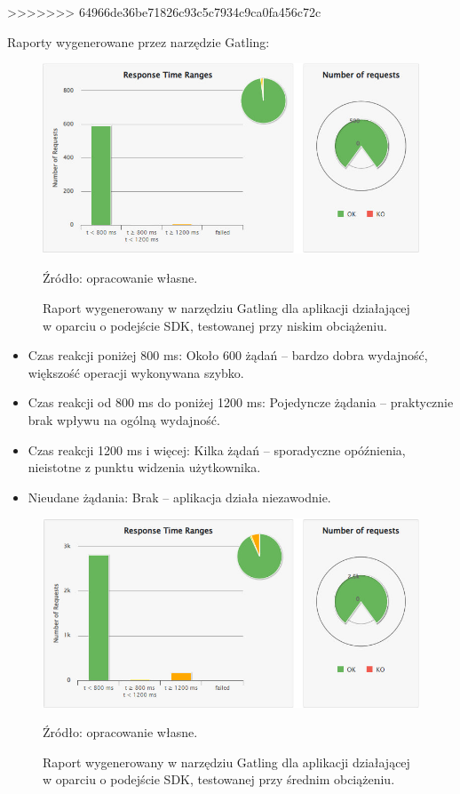 \documentclass[runningheads,12pt]{llncs}
\begin{document}
>>>>>>> 64966de36be71826c93c5c7934c9ca0fa456c72c
\newpage


Raporty wygenerowane przez narzędzie Gatling:

\begin{figure}
    \centering
    \includegraphics[width=0.8\linewidth]{images/sdk-gatling-low-graph.jpg}
    \caption{Raport wygenerowany w narzędziu Gatling dla aplikacji działającej w oparciu o podejście SDK, testowanej przy niskim obciążeniu.}
    \label{fig:low}
    \vspace{0.5em}
    {\small Źródło: opracowanie własne.}
\end{figure}

\begin{itemize}
    \item Czas reakcji poniżej 800 ms: Około 600 żądań – bardzo dobra wydajność, większość operacji wykonywana szybko.
    \item Czas reakcji od 800 ms do poniżej 1200 ms: Pojedyncze żądania – praktycznie brak wpływu na ogólną wydajność.
    \item Czas reakcji 1200 ms i więcej: Kilka żądań – sporadyczne opóźnienia, nieistotne z punktu widzenia użytkownika.
    \item Nieudane żądania: Brak – aplikacja działa niezawodnie.
\end{itemize}

\newpage

\begin{figure}
    \centering
    \includegraphics[width=0.8\linewidth]{images/sdk-gatling-middle-graph.jpg}
    \caption{Raport wygenerowany w narzędziu Gatling dla aplikacji działającej w oparciu o podejście SDK, testowanej przy średnim obciążeniu.}
    \label{fig:middle}
    \vspace{0.5em}
    {\small Źródło: opracowanie własne.}
\end{figure}
\end{document}
